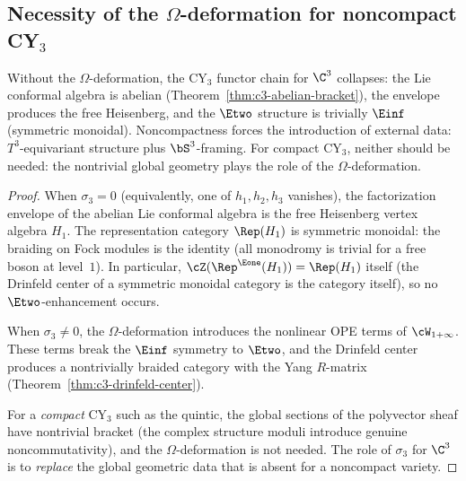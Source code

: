 \subsection{Necessity of the \texorpdfstring{$\Omega$}{Omega}-deformation for noncompact CY\texorpdfstring{$_3$}{-3}}
\label{subsec:omega-necessary}

\begin{proposition}
\label{prop:omega-necessary}
Without the $\Omega$-deformation, the CY$_3$ functor chain for $\C^3$ collapses: the Lie conformal algebra is abelian (Theorem~\textup{\ref{thm:c3-abelian-bracket}}), the envelope produces the free Heisenberg, and the $\Etwo$ structure is trivially $\Einf$ (symmetric monoidal). Noncompactness forces the introduction of external data: $T^3$-equivariant structure plus $\bS^3$-framing. For compact CY$_3$, neither should be needed: the nontrivial global geometry plays the role of the $\Omega$-deformation.
\end{proposition}

\begin{proof}
When $\sigma_3 = 0$ (equivalently, one of $h_1, h_2, h_3$ vanishes), the factorization envelope of the abelian Lie conformal algebra is the free Heisenberg vertex algebra $H_1$. The representation category $\Rep(H_1)$ is symmetric monoidal: the braiding on Fock modules is the identity (all monodromy is trivial for a free boson at level~$1$). In particular, $\cZ(\Rep^{\Eone}(H_1)) = \Rep(H_1)$ itself (the Drinfeld center of a symmetric monoidal category is the category itself), so no $\Etwo$-enhancement occurs.

When $\sigma_3 \neq 0$, the $\Omega$-deformation introduces the nonlinear OPE terms of $\cW_{1+\infty}$. These terms break the $\Einf$ symmetry to $\Etwo$, and the Drinfeld center produces a nontrivially braided category with the Yang $R$-matrix (Theorem~\ref{thm:c3-drinfeld-center}).

For a \emph{compact} CY$_3$ such as the quintic, the global sections of the polyvector sheaf have nontrivial bracket (the complex structure moduli introduce genuine noncommutativity), and the $\Omega$-deformation is not needed. The role of $\sigma_3$ for $\C^3$ is to \emph{replace} the global geometric data that is absent for a noncompact variety.
\end{proof}

